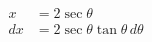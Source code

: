 \documentclass[preview]{standalone}
\begin{document}
\begin{align*}
x&=2\sec\theta \\ dx&=2\sec\theta\tan\theta \, d\theta
\end{align*}
\end{document}
